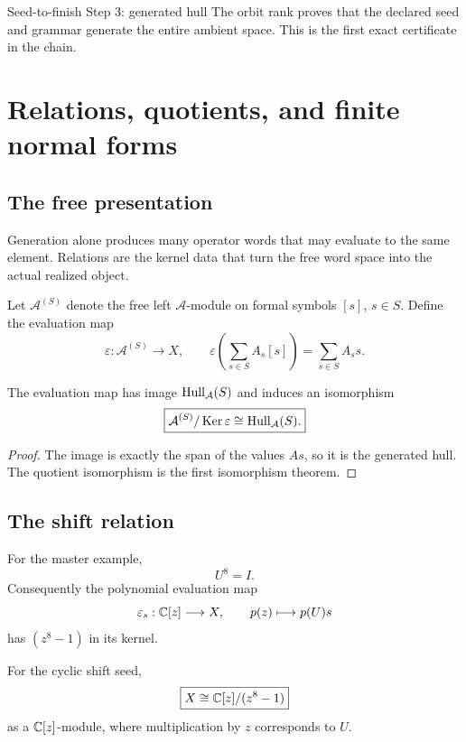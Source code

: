 \begin{stepbox}{Seed-to-finish Step 3: generated hull}
The orbit rank proves that the declared seed and grammar generate the entire ambient space.  This is the first exact certificate in the chain.
\end{stepbox}

\chapter{Relations, quotients, and finite normal forms}\label{ch:relations}

\section{The free presentation}
Generation alone produces many operator words that may evaluate to the same element.  Relations are the kernel data that turn the free word space into the actual realized object.

Let $\mathcal A^{(S)}$ denote the free left $\mathcal A$-module on formal symbols $[s]$, $s\in S$.  Define the evaluation map
\[
\varepsilon:\mathcal A^{(S)}\longrightarrow X,
\qquad
\varepsilon\!\left(\sum_{s\in S}A_s[s]\right)
=
\sum_{s\in S}A_ss.
\]

\begin{theorem}\label{thm:seed-presentation}
The evaluation map has image $\operatorname{Hull}_{\mathcal A}(S)$ and induces an isomorphism
\[
\boxed{
\mathcal A^{(S)}/\operatorname{Ker}\varepsilon
\cong
\operatorname{Hull}_{\mathcal A}(S).
}
\]
\end{theorem}

\begin{proof}
The image is exactly the span of the values $As$, so it is the generated hull.  The quotient isomorphism is the first isomorphism theorem.
\end{proof}

\section{The shift relation}
For the master example,
\[
U^8=I.
\]
Consequently the polynomial evaluation map
\[
\varepsilon_s:\mathbb C[z]\longrightarrow X,
\qquad
p(z)\longmapsto p(U)s
\]
has $(z^8-1)$ in its kernel.

\begin{proposition}\label{prop:cyclic-quotient}
For the cyclic shift seed,
\[
\boxed{
X\cong \mathbb C[z]/(z^8-1)
}
\]
as a $\mathbb C[z]$-module, where multiplication by $z$ corresponds to $U$.
\end{proposition}

